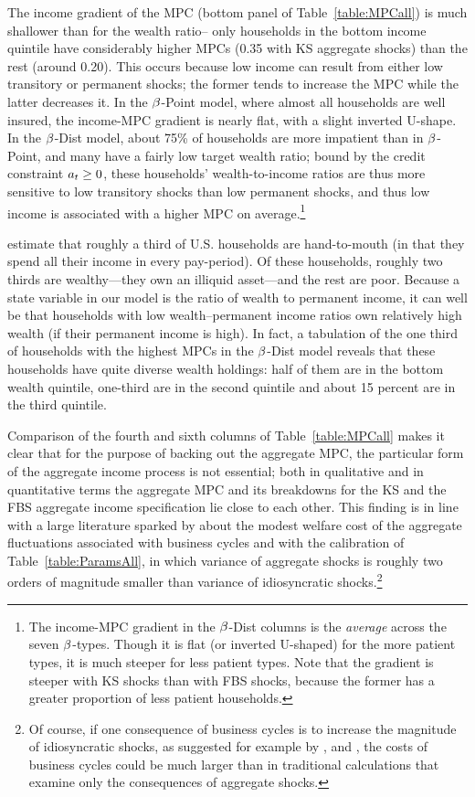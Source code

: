 \documentclass[12pt,titlepage]{econtex}
\begin{document}
The income gradient of the MPC (bottom panel of Table~\ref{table:MPCall}) is much shallower than for the wealth ratio-- only households in the bottom income quintile have considerably higher MPCs (0.35 with KS aggregate shocks) than the rest (around 0.20).  This occurs because low income can result from either low transitory or permanent shocks; the former tends to increase the MPC while the latter decreases it.  In the $\beta$-Point model, where almost all households are well insured, the income-MPC gradient is nearly flat, with a slight inverted U-shape.  In the $\beta$-Dist model, about 75\% of households are more impatient than in $\beta$-Point, and many have a fairly low target wealth ratio; bound by the credit constraint $a_t \geq 0$, these households' wealth-to-income ratios are thus more sensitive to low transitory shocks than low permanent shocks, and thus low income is associated with a higher MPC on average.\footnote{The income-MPC gradient in the $\beta$-Dist columns is the \textit{average} across the seven $\beta$-types.  Though it is flat (or inverted U-shaped) for the more patient types, it is much steeper for less patient types.  Note that the gradient is steeper with KS shocks than with FBS shocks, because the former has a greater proportion of less patient households.}

\cite{kaplanViolanteWeidner_wealthyH2M} estimate that roughly a third of U.S. households are hand-to-mouth (in that they spend all their income in every pay-period). Of these households, roughly two thirds are wealthy---they own an illiquid asset---and the rest are poor. Because a state variable in our model is the ratio of wealth to permanent income, it can well be that households with low wealth--permanent income ratios own relatively high wealth (if their permanent income is high). In fact, a tabulation of the one third of households with the highest MPCs in the $\beta$-Dist model reveals that these households have quite diverse wealth holdings: half of them are in the bottom wealth quintile, one-third are in the second quintile and about 15 percent are in the third quintile.

Comparison of the fourth and sixth columns of Table~\ref{table:MPCall} makes it clear that for the purpose of
backing out the aggregate MPC, the particular form of the aggregate
income process is not essential; both in qualitative and in
quantitative terms the aggregate MPC and its breakdowns for the KS and
the FBS aggregate income specification lie close to each other.  This
finding is in line with a large literature sparked by
\citet{lucasBusinessCycles} about the modest welfare cost of the
aggregate fluctuations associated with business cycles and with the
calibration of Table~\ref{table:ParamsAll}, in which variance of
aggregate shocks is roughly two orders of magnitude smaller than
variance of idiosyncratic shocks.\footnote{Of course, if one consequence of
  business cycles is to increase the magnitude of idiosyncratic shocks,
  as suggested for example by \cite{mcKayPapp:wageRiskOverBC}, \cite{gosCyclical} and \cite{Blundell:2013tm}, the costs of business cycles could be much larger than in traditional calculations that
  examine only the consequences of aggregate shocks.}
\end{document}

